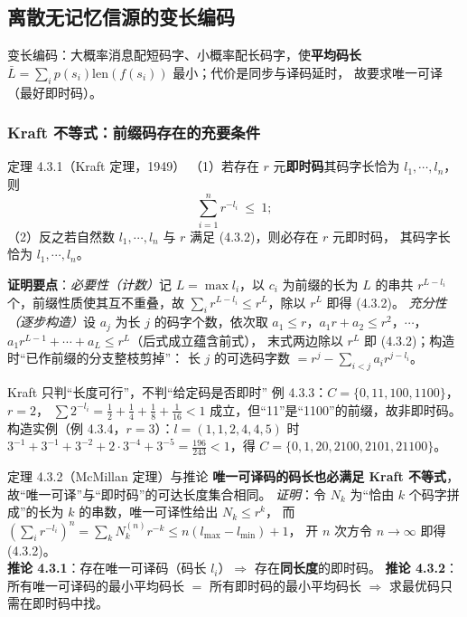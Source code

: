 \subsection{离散无记忆信源的变长编码}

变长编码：大概率消息配短码字、小概率配长码字，使\textbf{平均码长}
$\bar L=\sum_i p(s_i)\mathrm{len}\!\left(f(s_i)\right)$ 最小；代价是同步与译码延时，
故要求唯一可译（最好即时码）。

\subsubsection{Kraft 不等式：前缀码存在的充要条件}
\begin{thmbox}{定理 4.3.1（Kraft 定理，1949）}
（1）若存在 $r$ 元\textbf{即时码}其码字长恰为 $l_1,\cdots,l_n$，则
\begin{equation}
\sum_{i=1}^{n}r^{-l_i}\ \le\ 1 ;
\tag{4.3.2}
\end{equation}
（2）反之若自然数 $l_1,\cdots,l_n$ 与 $r$ 满足 (4.3.2)，则必存在 $r$ 元即时码，
其码字长恰为 $l_1,\cdots,l_n$。
\end{thmbox}
\textbf{证明要点}：\emph{必要性（计数）}记 $L=\max l_i$，以 $c_i$ 为前缀的长为 $L$ 的串共
$r^{L-l_i}$ 个，前缀性质使其互不重叠，故 $\sum_ir^{L-l_i}\le r^{L}$，除以 $r^{L}$ 即得 (4.3.2)。
\emph{充分性（逐步构造）}设 $a_j$ 为长 $j$ 的码字个数，依次取
$a_1\le r$，$a_1r+a_2\le r^{2}$，$\cdots$，$a_1r^{L-1}+\cdots+a_L\le r^{L}$（后式成立蕴含前式），
末式两边除以 $r^{L}$ 即 (4.3.2)；构造时“已作前缀的分支整枝剪掉”：
长 $j$ 的可选码字数 $=r^{j}-\sum_{i<j}a_ir^{j-l_i}$。

\begin{warning}{Kraft 只判“长度可行”，不判“给定码是否即时”}
例 4.3.3：$C=\{0,11,100,1100\}$，$r=2$，
$\sum2^{-l_i}=\frac12+\frac14+\frac18+\frac1{16}<1$ 成立，但“11”是“1100”的前缀，故非即时码。
构造实例（例 4.3.4，$r=3$）：$l=(1,1,2,4,4,5)$ 时
$3^{-1}+3^{-1}+3^{-2}+2\cdot3^{-4}+3^{-5}=\frac{196}{243}<1$，得
$C=\{0,1,20,2100,2101,21100\}$。
\end{warning}

\begin{thmbox}{定理 4.3.2（McMillan 定理）与推论}
\textbf{唯一可译码的码长也必满足 Kraft 不等式}，故“唯一可译”与“即时码”的可达长度集合相同。
\emph{证明}：令 $N_k$ 为“恰由 $k$ 个码字拼成”的长为 $k$ 的串数，唯一可译性给出 $N_k\le r^{k}$，
而 $\left(\sum_ir^{-l_i}\right)^{n}=\sum_kN_k^{(n)}r^{-k}\le n(l_{\max}-l_{\min})+1$，
开 $n$ 次方令 $n\to\infty$ 即得 (4.3.2)。\\
\textbf{推论 4.3.1}：存在唯一可译码（码长 $l_i$）$\Rightarrow$ 存在\textbf{同长度}的即时码。
\textbf{推论 4.3.2}：所有唯一可译码的最小平均码长 $=$ 所有即时码的最小平均码长
$\Rightarrow$ 求最优码只需在即时码中找。
\end{thmbox}

